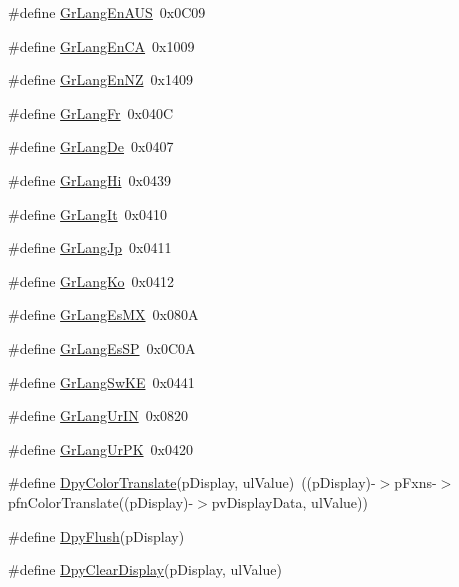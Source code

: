 \begin{DoxyCompactItemize}
\item 
\#define \hyperlink{group__primitives__api_ga7e799ab7f46ee1bfdf6f70d61429e995}{Gr\+Lang\+En\+A\+U\+S}~0x0\+C09
\item 
\#define \hyperlink{group__primitives__api_ga7e34c44d82b3607e848796a0feb10b21}{Gr\+Lang\+En\+C\+A}~0x1009
\item 
\#define \hyperlink{group__primitives__api_ga2d9b840ec32e3556c4a73e5de612a0d5}{Gr\+Lang\+En\+N\+Z}~0x1409
\item 
\#define \hyperlink{group__primitives__api_ga551e8d24b87d69cbd19167daa9a106ff}{Gr\+Lang\+Fr}~0x040\+C
\item 
\#define \hyperlink{group__primitives__api_gafd48d2c7e62ccfaec2d96b3e9b83c134}{Gr\+Lang\+De}~0x0407
\item 
\#define \hyperlink{group__primitives__api_gabfa5e8222ce38e1235191f24b6dae37a}{Gr\+Lang\+Hi}~0x0439
\item 
\#define \hyperlink{group__primitives__api_ga8ba06fcb06ffc5825bf82f34696490ff}{Gr\+Lang\+It}~0x0410
\item 
\#define \hyperlink{group__primitives__api_gaf1bca101269cef154549f20673813ba9}{Gr\+Lang\+Jp}~0x0411
\item 
\#define \hyperlink{group__primitives__api_ga377136868180f4de76f71cdf9df646f9}{Gr\+Lang\+Ko}~0x0412
\item 
\#define \hyperlink{group__primitives__api_ga431d4840c4ab5fff29ee65760a2217ab}{Gr\+Lang\+Es\+M\+X}~0x080\+A
\item 
\#define \hyperlink{group__primitives__api_gae77e59c687003aab0f37168c6db8cb9f}{Gr\+Lang\+Es\+S\+P}~0x0\+C0\+A
\item 
\#define \hyperlink{group__primitives__api_gad5f550378058f60cf6e90511f4fa6287}{Gr\+Lang\+Sw\+K\+E}~0x0441
\item 
\#define \hyperlink{group__primitives__api_ga40afbc90f41e8b3d9012b82ce9b61c1c}{Gr\+Lang\+Ur\+I\+N}~0x0820
\item 
\#define \hyperlink{group__primitives__api_gab6b0105533dd300c9fa27563b39b3c64}{Gr\+Lang\+Ur\+P\+K}~0x0420
\item 
\#define \hyperlink{group__primitives__api_ga49a5dcca6ebf8e21292437f51803166f}{Dpy\+Color\+Translate}(p\+Display,  ul\+Value)~((p\+Display)-\/$>$p\+Fxns-\/$>$pfn\+Color\+Translate((p\+Display)-\/$>$pv\+Display\+Data, ul\+Value))
\item 
\#define \hyperlink{group__primitives__api_ga32e24d2b562ee1f3e9a673ca100b1de1}{Dpy\+Flush}(p\+Display)
\item 
\#define \hyperlink{group__primitives__api_gaf8a3321fd7d40496d11b2741dbc6dff1}{Dpy\+Clear\+Display}(p\+Display,  ul\+Value)

\end{DoxyCompactItemize}
